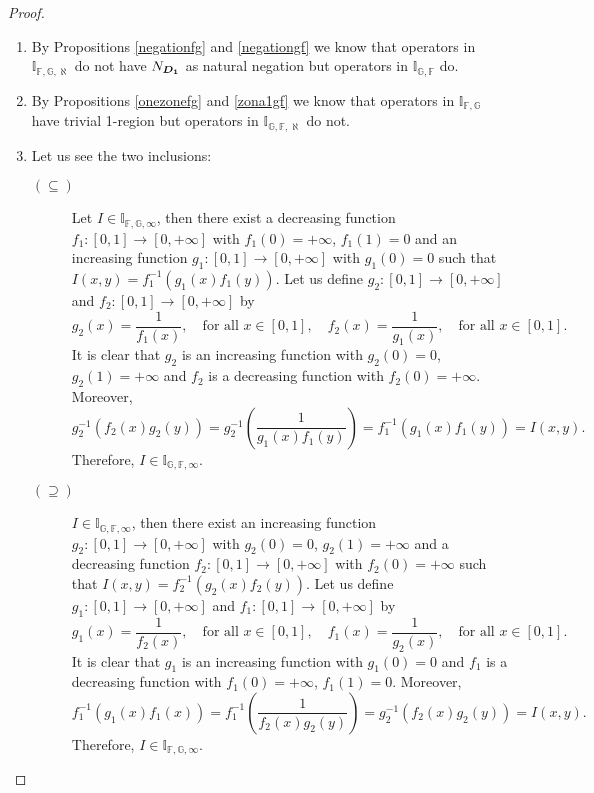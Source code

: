 \begin{proof}
	\hspace{0.5cm}
	\begin{enumerate}[label=(\roman*)]
		\item By Propositions \ref{negationfg} and \ref{negationgf} we know that operators in $\mathbb{I}_{\mathbb{F},\mathbb{G},\aleph}$ do not have $N_{\bm{D_1}}$ as natural negation but operators in $\mathbb{I}_{\mathbb{G},\mathbb{F}}$ do.
		\item By Propositions \ref{onezonefg} and \ref{zona1gf} we know that operators in  $\mathbb{I}_{\mathbb{F},\mathbb{G}}$ have trivial 1-region but operators in $\mathbb{I}_{\mathbb{G},\mathbb{F},\aleph}$ do not.
		\item Let us see the two inclusions:
		\begin{description}
			\item[$(\subseteq)$] Let $I \in \mathbb{I}_{\mathbb{F},\mathbb{G},\infty}$, then there exist a decreasing function $f_1:[0,1] \to [0,+\infty]$ with $f_1(0)=+\infty$, $f_1(1)=0$ and an increasing function $g_1:[0,1] \to [0,+\infty]$ with $g_1(0)=0$ such that $I(x,y)=f_1^{-1}(g_1(x)f_1(y))$. Let us define $g_2:[0,1] \to [0,+\infty]$ and $f_2:[0,1] \to [0,+\infty]$ by
			$$g_2(x)=\frac{1}{f_1(x)}, \quad \text{for all } x \in [0,1], \quad f_2(x)=\frac{1}{g_1(x)}, \quad \text{for all } x \in [0,1].$$
			It is clear that $g_2$ is an increasing function with $g_2(0)=0$, $g_2(1)=+\infty$ and $f_2$ is a decreasing function with $f_2(0)=+\infty$. Moreover,
			$$g_2^{-1}(f_2(x)g_2(y))=g_2^{-1}\left(\frac{1}{g_1(x)f_1(y)}\right) = f_1^{-1}(g_1(x)f_1(y))=I(x,y).$$
			Therefore, $I \in \mathbb{I}_{\mathbb{G},\mathbb{F},\infty}$.
			\item[$(\supseteq)$] $I \in \mathbb{I}_{\mathbb{G},\mathbb{F,\infty}}$, then there exist an increasing function $g_2:[0,1] \to [0,+\infty]$ with $g_2(0)=0$, $g_2(1)=+\infty$ and a decreasing function $f_2:[0,1] \to [0,+\infty]$ with $f_2(0)=+\infty$ such that $I(x,y)=f_2^{-1}(g_2(x)f_2(y))$. Let us define $g_1:[0,1] \to [0,+\infty]$ and $f_1:[0,1] \to [0,+\infty]$ by
			$$g_1(x)=\frac{1}{f_2(x)}, \quad \text{for all } x \in [0,1], \quad f_1(x)=\frac{1}{g_2(x)}, \quad \text{for all } x \in [0,1].$$
			It is clear that $g_1$ is an increasing function with $g_1(0)=0$ and $f_1$ is a decreasing function with $f_1(0)=+\infty$, $f_1(1)=0$. Moreover,
			$$f_1^{-1}(g_1(x)f_1(x))=f_1^{-1}\left(\frac{1}{f_2(x)g_2(y)}\right)=g_2^{-1}(f_2(x)g_2(y))=I(x,y).$$
			Therefore, $I \in \mathbb{I}_{\mathbb{F},\mathbb{G},\infty}$.
		\end{description}
	\end{enumerate}
\end{proof}



